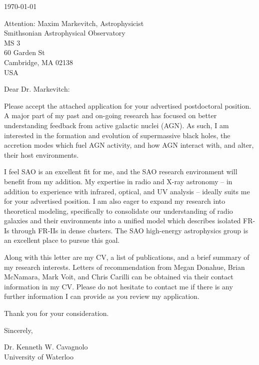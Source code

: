 \documentclass[12pt]{article}
\begin{document}
\today

Attention: Maxim Markevitch, Astrophysicist\\
Smithsonian Astrophysical Observatory\\
MS 3\\
60 Garden St\\
Cambridge, MA 02138\\
USA

Dear Dr. Markevitch:

Please accept the attached application for your advertised
postdoctoral position. A major part of my past and on-going research
has focused on better understanding feedback from active galactic
nuclei (AGN). As such, I am interested in the formation and evolution
of supermassive black holes, the accretion modes which fuel AGN
activity, and how AGN interact with, and alter, their host
environments.

I feel SAO is an excellent fit for me, and the SAO research
environment will benefit from my addition. My expertise in radio and
X-ray astronomy -- in addition to experience with infrared, optical,
and UV analysis -- ideally suits me for your advertised position. I am
also eager to expand my research into theoretical modeling,
specifically to consolidate our understanding of radio galaxies and
their environments into a unified model which describes isolated FR-Is
through FR-IIs in dense clusters. The SAO high-energy astrophysics
group is an excellent place to pursue this goal.

Along with this letter are my CV, a list of publications, and a brief
summary of my research interests. Letters of recommendation from Megan
Donahue, Brian McNamara, Mark Voit, and Chris Carilli can be obtained
via their contact information in my CV. Please do not hesitate to
contact me if there is any further information I can provide as you
review my application.

Thank you for your consideration.

Sincerely,\\
\begin{minipage}{7.5in}
\end{minipage}
Dr. Kenneth W. Cavagnolo\\
University of Waterloo
\end{document}
